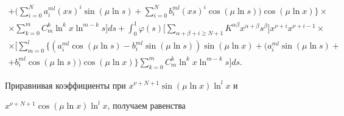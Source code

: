 \begin{multline*}
% 


+\bigg(\sum^N_{i=0}a^{ml}_i(xs)^i\sin(\mu\ln s)+ 


\sum^N_{i=0}b^{ml}_i(xs)^i\cos(\mu\ln s)\bigg)\cos(\mu\ln x) 


\bigg\}\times\\ 


% 


\times\sum^m_{k=0}C^k_m\ln^k x\ln^{m-k}s\bigg]ds+\int^1_0 


\varphi(s)\bigg[\sum_{\alpha+\beta+i\ge N+1}K^{\alpha\beta} 


x^{\alpha+\beta}s^\beta\bigg]x^{\nu+i}x^{\nu+i-1}\times \\ 


% 


\times\bigg[\sum^l_{m=0}\{(a^{ml}_i\cos(\mu\ln s)- 


b^{ml}_i\sin(\mu\ln s))\sin(\mu\ln x)+ 


(a^{ml}_i\sin(\mu\ln s)+ \\ 


% 


+b^{ml}_i\cos(\mu\ln s))\cos(\mu\ln x)\}\sum^m_{k=0} 


C^k_m\ln^k x\ln^{m-k}s\bigg]ds. 


\end{multline*} 


 


Приравнивая коэффициенты при $x^{\nu+N+1}\sin(\mu\ln x)\ln^l x$ и 


$x^{\nu+N+1}\cos(\mu\ln x)\ln^l x$, получаем равенства 


